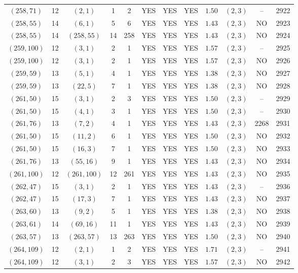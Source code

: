 \begin{longtable}{|c|c|c|c|c|c|c|c|c|c|c|c|}
$(258,71)$ & 12 & $(2,1)$ & 1 & 2 & YES & YES & YES & $1.50$ & $(2,3)$ & -- & 2922\\
$(258,55)$ & 14 & $(6,1)$ & 5 & 6 & YES & YES & YES & $1.43$ & $(2,3)$ & NO & 2923\\
$(258,55)$ & 14 & $(258,55)$ & 14 & 258 & YES & YES & YES & $1.43$ & $(2,3)$ & NO & 2924\\
$(259,100)$ & 12 & $(3,1)$ & 2 & 1 & YES & YES & YES & $1.57$ & $(2,3)$ & -- & 2925\\
$(259,100)$ & 12 & $(3,1)$ & 2 & 1 & YES & YES & YES & $1.57$ & $(2,3)$ & NO & 2926\\
$(259,59)$ & 13 & $(5,1)$ & 4 & 1 & YES & YES & YES & $1.38$ & $(2,3)$ & NO & 2927\\
$(259,59)$ & 13 & $(22,5)$ & 7 & 1 & YES & YES & YES & $1.38$ & $(2,3)$ & NO & 2928\\
$(261,50)$ & 15 & $(3,1)$ & 2 & 3 & YES & YES & YES & $1.50$ & $(2,3)$ & -- & 2929\\
$(261,50)$ & 15 & $(4,1)$ & 3 & 1 & YES & YES & YES & $1.50$ & $(2,3)$ & -- & 2930\\
$(261,76)$ & 13 & $(7,2)$ & 4 & 1 & YES & YES & YES & $1.43$ & $(2,3)$ & 2268 & 2931\\
$(261,50)$ & 15 & $(11,2)$ & 6 & 1 & YES & YES & YES & $1.50$ & $(2,3)$ & NO & 2932\\
$(261,50)$ & 15 & $(16,3)$ & 7 & 1 & YES & YES & YES & $1.50$ & $(2,3)$ & NO & 2933\\
$(261,76)$ & 13 & $(55,16)$ & 9 & 1 & YES & YES & YES & $1.43$ & $(2,3)$ & NO & 2934\\
$(261,100)$ & 12 & $(261,100)$ & 12 & 261 & YES & YES & YES & $1.43$ & $(2,3)$ & NO & 2935\\
$(262,47)$ & 15 & $(3,1)$ & 2 & 1 & YES & YES & YES & $1.43$ & $(2,3)$ & -- & 2936\\
$(262,47)$ & 15 & $(17,3)$ & 7 & 1 & YES & YES & YES & $1.43$ & $(2,3)$ & NO & 2937\\
$(263,60)$ & 13 & $(9,2)$ & 5 & 1 & YES & YES & YES & $1.38$ & $(2,3)$ & NO & 2938\\
$(263,61)$ & 14 & $(69,16)$ & 11 & 1 & YES & YES & YES & $1.43$ & $(2,3)$ & NO & 2939\\
$(263,57)$ & 13 & $(263,57)$ & 13 & 263 & YES & YES & YES & $1.50$ & $(2,3)$ & NO & 2940\\
$(264,109)$ & 12 & $(2,1)$ & 1 & 2 & YES & YES & YES & $1.71$ & $(2,3)$ & -- & 2941\\
$(264,109)$ & 12 & $(3,1)$ & 2 & 3 & YES & YES & YES & $1.57$ & $(2,3)$ & NO & 2942\\

\end{longtable}
